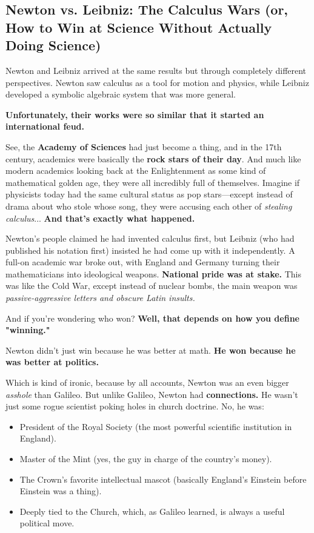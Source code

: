 \subsection{Newton vs. Leibniz: The Calculus Wars (or, How to Win at Science Without Actually Doing Science)}

Newton and Leibniz arrived at the same results but through completely different perspectives. Newton saw calculus as a tool for motion and physics, while Leibniz developed a symbolic algebraic system that was more general. 

\textbf{Unfortunately, their works were so similar that it started an international feud.} 

See, the \textbf{Academy of Sciences} had just become a thing, and in the 17th century, academics were basically the \textbf{rock stars of their day}. And much like modern academics looking back at the Enlightenment as some kind of mathematical golden age, they were all incredibly full of themselves. Imagine if physicists today had the same cultural status as pop stars—except instead of drama about who stole whose song, they were accusing each other of \textit{stealing calculus}... \textbf{And that’s exactly what happened.} 

Newton’s people claimed he had invented calculus first, but Leibniz (who had published his notation first) insisted he had come up with it independently. A full-on academic war broke out, with England and Germany turning their mathematicians into ideological weapons. \textbf{National pride was at stake.} This was like the Cold War, except instead of nuclear bombs, the main weapon was \textit{passive-aggressive letters and obscure Latin insults.} 

And if you’re wondering who won? \textbf{Well, that depends on how you define "winning."} 

Newton didn’t just win because he was better at math. \textbf{He won because he was better at politics.} 

Which is kind of ironic, because by all accounts, Newton was an even bigger \textit{asshole} than Galileo. But unlike Galileo, Newton had \textbf{connections.} He wasn’t just some rogue scientist poking holes in church doctrine. No, he was:  

\begin{itemize}
    \item President of the Royal Society (the most powerful scientific institution in England).  
    \item Master of the Mint (yes, the guy in charge of the country’s money).
    \item The Crown’s favorite intellectual mascot (basically England’s Einstein before Einstein was a thing).
    \item Deeply tied to the Church, which, as Galileo learned, is always a useful political move.
\end{itemize}


